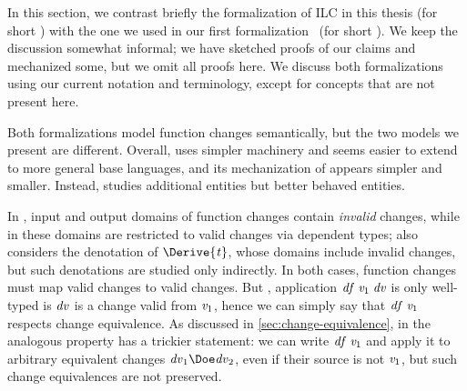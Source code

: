 In this section, we contrast briefly the formalization of ILC in this thesis (for short
\ilcB) with the one we used in our first formalization~\citep{CaiEtAl2014ILC}
(for short \ilcA). We keep the discussion somewhat informal; we have sketched
proofs of our claims and mechanized some, but we omit all proofs here.
We discuss both formalizations using our current notation and terminology,
except for concepts that are not present here.

Both formalizations model function changes semantically, but the two models we
present are different. Overall, \ilcB{} uses simpler machinery and seems easier
to extend to more general base languages, and its mechanization of \ilcB{}
appears simpler and smaller.
Instead, \ilcA{} studies additional entities but better behaved entities.

In \ilcB{}, input and output domains of function changes contain
\emph{invalid} changes, while in \ilcA{} these domains are restricted to valid
changes via dependent types; \ilcA{} also considers the denotation of \ensuremath{\Derive{\Varid{t}}},
whose domains include invalid changes, but such denotations are studied only indirectly.
In both cases, function changes must map valid
changes to valid changes. But \ilcA{}, application \ensuremath{\Varid{df}\;\Varid{v}_{1}\;\Varid{dv}} is only well-typed
is \ensuremath{\Varid{dv}} is a change valid from \ensuremath{\Varid{v}_{1}}, hence we can simply say that \ensuremath{\Varid{df}\;\Varid{v}_{1}} respects
change equivalence. As discussed in \cref{sec:change-equivalence}, in \ilcB{}
the analogous property has a trickier statement: we can write \ensuremath{\Varid{df}\;\Varid{v}_{1}} and apply
it to arbitrary equivalent changes \ensuremath{\Varid{dv}_{1}\Doe\Varid{dv}_{2}}, even if their source is not
\ensuremath{\Varid{v}_{1}}, but such change equivalences are not preserved.

